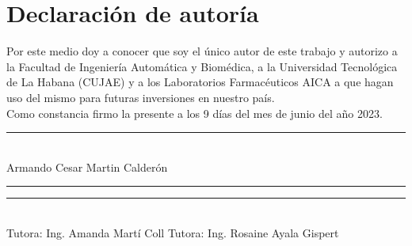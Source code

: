 \documentclass[
	spanish, %
	letterpaper, oneside
]{book}
\begin{document}
\templatePortrait

\templatePagecfg

\newcommand{\keywords}[1]{\par\noindent #1}
\newcommand{\abstracttext}[1]{\par #1}

\newpage
\section*{Declaración de autoría}
Por este medio doy a conocer que soy el único autor de este trabajo y
autorizo a la Facultad de Ingeniería Automática y Biomédica, a la Universidad
Tecnológica de La Habana (CUJAE) y a los Laboratorios Farmacéuticos AICA a
que hagan uso del mismo para futuras inversiones en nuestro país.\\
Como constancia firmo la presente a los 9 días del mes de junio del año
2023.

\vspace{2cm}
\begin{center}
    \rule{6cm}{0.4pt}\\
    \vspace{0.5cm}
    Armando Cesar Martin Calderón \\
    \vspace*{3cm}
    \rule{6cm}{0.4pt}
    \hspace*{2cm}
    \rule{6cm}{0.4pt} \\
    \vspace{0.5cm}
    Tutora:	Ing. Amanda Martí Coll
    \hspace*{2cm}
    Tutora: Ing. Rosaine Ayala Gispert
\end{center}


\newpage
\end{document}
